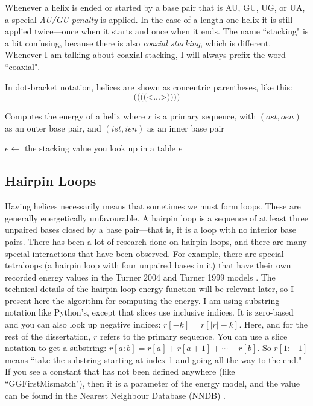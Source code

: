\documentclass{cshonours}
\begin{document}
Whenever a helix is ended or started by a base pair that is AU, GU, UG, or UA, a special \emph{AU/GU penalty} is applied. In the case of a length one helix it is still applied twice---once when it starts and once when it ends. The name ``stacking" is a bit confusing, because there is also \emph{coaxial stacking}, which is different. Whenever I am talking about coaxial stacking, I will always prefix the word ``coaxial".

In dot-bracket notation, helices are shown as concentric parentheses, like this:
$$\texttt{((((<...>))))}$$

\begin{algorithm}[H]
\caption{Computes the energy of a helix where $r$ is a primary sequence, with $(ost, oen)$ as an outer base pair, and $(ist, ien)$ as an inner base pair}
\label{alg:stacking_energy}
\begin{algorithmic}
\State $e \gets$ the stacking value you look up in a table
\State \Return $e$
\EndFunction
\end{algorithmic}
\end{algorithm}

\subsection{Hairpin Loops}
Having helices necessarily means that sometimes we must form loops. These are generally energetically unfavourable. A hairpin loop is a sequence of at least three unpaired bases closed by a base pair---that is, it is a loop with no interior base pairs. There has been a lot of research done on hairpin loops, and there are many special interactions that have been observed. For example, there are special tetraloops (a hairpin loop with four unpaired bases in it) that have their own recorded energy values in the Turner 2004 and Turner 1999 models \cite{t99, t04}. The technical details of the hairpin loop energy function will be relevant later, so I present here the algorithm for computing the energy. I am using substring notation like Python's, except that slices use inclusive indices. It is zero-based and you can also look up negative indices: $r[-k] = r[|r| - k]$. Here, and for the rest of the dissertation, $r$ refers to the primary sequence. You can use a slice notation to get a substring: $r[a:b] = r[a] + r[a + 1] + \cdots + r[b]$. So $r[1:-1]$ means ``take the substring starting at index 1 and going all the way to the end." If you see a constant that has not been defined anywhere (like ``GGFirstMismatch"), then it is a parameter of the energy model, and the value can be found in the Nearest Neighbour Database (NNDB) \cite{tNndb}.
\end{document}
